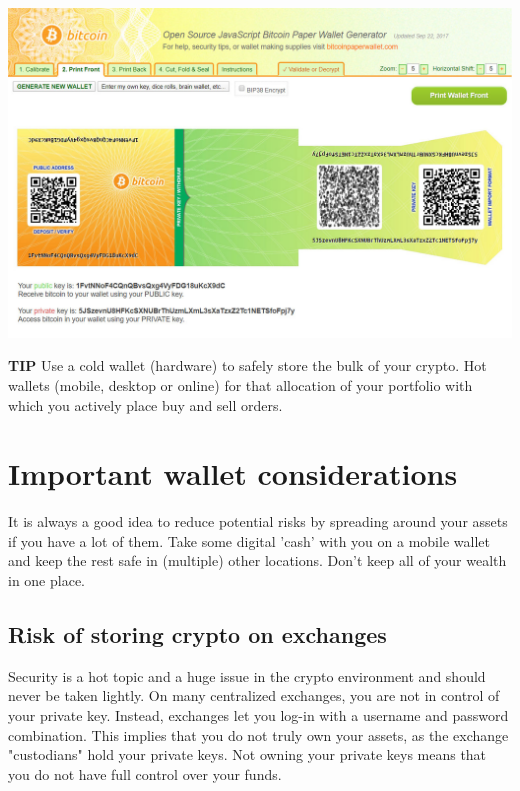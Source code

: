     \bigskip
    \begin{borderbox}
        \includegraphics[width=\textwidth]{img/ch-wallets/paper-wallet-bitcoin.jpg}
    \end{borderbox}
    \medskip

    \begin{tipbox}{\textbf{TIP}}
    Use a cold wallet (hardware) to safely store the bulk of your crypto. Hot wallets (mobile, desktop or online) for that allocation of your portfolio with which you actively place buy and sell orders. 
    \end{tipbox}

\section{Important wallet considerations}
It is always a good idea to reduce potential risks by spreading around your assets if you have a lot of them. Take some digital 'cash' with you on a mobile wallet and keep the rest safe in (multiple) other locations. Don't keep all of your wealth in one place. 
\subsection{Risk of storing crypto on exchanges}
Security is a hot topic and a huge issue in the crypto environment and should never be taken lightly. On many centralized exchanges, you are not in control of your private key. Instead, exchanges let you log-in with a username and password combination. This implies that you do not truly own your assets, as the exchange "custodians" hold your private keys. Not owning your private keys means that you do not have full control over your funds.\medskip

